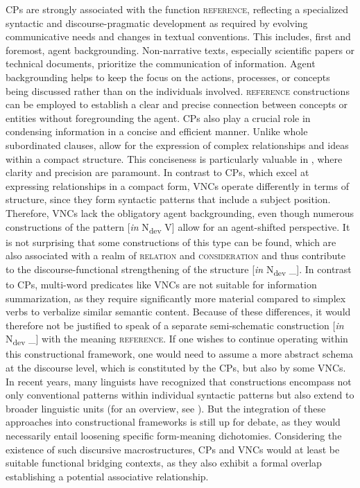 \documentclass[output=paper,colorlinks,citecolor=brown]{langscibook}
\begin{document}
CPs are strongly associated with the function \textsc{reference}, reflecting a specialized syntactic and discourse-pragmatic development as required by evolving communicative needs and changes in textual conventions. This includes, first and foremost, agent backgrounding. Non-narrative texts, especially scientific papers or technical documents, prioritize the communication of information. Agent backgrounding helps to keep the focus on the actions, processes, or concepts being discussed rather than on the individuals involved. \textsc{reference} constructions can be employed to establish a clear and precise connection between concepts or entities without foregrounding the agent. CPs also play a crucial role in condensing information in a concise and efficient manner. Unlike whole subordinated clauses,  allow for the expression of complex relationships and ideas within a compact structure. This conciseness is particularly valuable in , where clarity and precision are paramount. In contrast to CPs, which excel at expressing relationships in a compact form, VNCs operate differently in terms of structure, since they form syntactic patterns that include a subject position. Therefore, VNCs lack the obligatory agent backgrounding, even though numerous constructions of the pattern [\textit{in} N\textsubscript{dev} V] allow for an agent-shifted perspective. It is not surprising that some constructions of this type can be found, which are also associated with a realm of \textsc{relation} and \textsc{consideration} and thus contribute to the discourse-functional strengthening of the structure [\textit{in} N\textsubscript{dev} \_]. In contrast to CPs, multi-word predicates like VNCs are not suitable for information summarization, as they require significantly more material compared to simplex verbs to verbalize similar semantic content. Because of these differences, it would therefore not be justified to speak of a separate semi-schematic construction [\textit{in} N\textsubscript{dev} \_] with the meaning \textsc{reference}. If one wishes to continue operating within this constructional framework, one would need to assume a more abstract schema at the discourse level, which is constituted by the CPs, but also by some VNCs. In recent years, many linguists have recognized that constructions encompass not only conventional patterns within individual syntactic patterns but also extend to broader linguistic units (for an overview, see \citealt{EnghelsSansiñena2021}). But the integration of these approaches into constructional frameworks is still up for debate, as they would necessarily entail loosening specific form-meaning dichotomies. Considering the existence of such discursive macrostructures, CPs and VNCs would at least be suitable functional bridging contexts, as they also exhibit a formal overlap establishing a potential associative relationship. 
\end{document}
